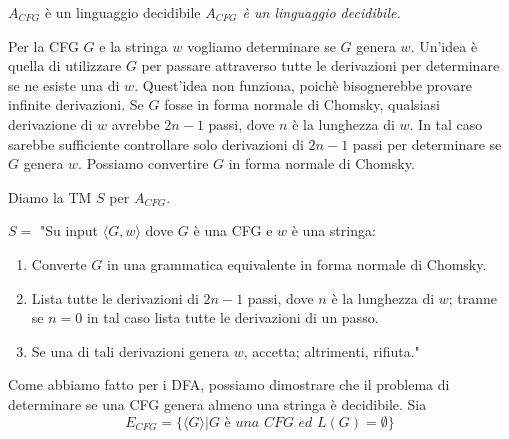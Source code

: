 \begin{Thm}{$A_{CFG}$ è un linguaggio decidibile}{}
\textit{$A_{CFG}$ è un linguaggio decidibile.}

\begin{osservation}
Per la CFG $G$ e la stringa $w$ vogliamo determinare se $G$ genera $w$. Un'idea è quella di utilizzare $G$ per passare attraverso tutte le derivazioni per determinare se ne esiste una di $w$. Quest'idea non funziona, poichè bisognerebbe provare infinite derivazioni. Se $G$ fosse in forma normale di Chomsky, qualsiasi derivazione di $w$ avrebbe $2n - 1$ passi, dove $n$ è la lunghezza di $w$. In tal caso sarebbe sufficiente controllare solo derivazioni di $2n - 1$ passi per determinare se $G$ genera $w$. Possiamo convertire $G$ in forma normale di Chomsky.
\end{osservation}

\begin{demonstration}
Diamo la TM $S$ per $A_{CFG}$.

$S =$ "Su input $\langle G, w\rangle$ dove $G$ è una CFG e $w$ è una stringa:
\begin{enumerate}
    \item Converte $G$ in una grammatica equivalente in forma normale di Chomsky.
    \item Lista tutte le derivazioni di $2n - 1$ passi, dove $n$ è la lunghezza di $w$; tranne se $n = 0$ in tal caso lista tutte le derivazioni di un passo.
    \item Se una di tali derivazioni genera $w$, accetta; altrimenti, rifiuta."
\end{enumerate}    
\end{demonstration}
\end{Thm}

Come abbiamo fatto per i DFA, possiamo dimostrare che il problema di determinare se una CFG genera almeno una stringa è decidibile. Sia
\begin{equation*}
E_{CFG}=\{\langle G\rangle | G\textit{ è una CFG ed }L(G) = \emptyset\}
\end{equation*}


